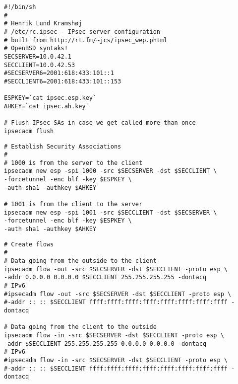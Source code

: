 \documentclass[Screen16to9,17pt,footrule]{foils}
\begin{document}
\begin{verbatim}
#!/bin/sh
#
# Henrik Lund Kramshøj
# /etc/rc.ipsec - IPsec server configuration
# built from http://rt.fm/~jcs/ipsec_wep.phtml
# OpenBSD syntaks!
SECSERVER=10.0.42.1
SECCLIENT=10.0.42.53
#SECSERVER6=2001:618:433:101::1
#SECCLIENT6=2001:618:433:101::153

ESPKEY=`cat ipsec.esp.key`
AHKEY=`cat ipsec.ah.key`

# Flush IPsec SAs in case we get called more than once
ipsecadm flush
\end{verbatim}



\begin{verbatim}
# Establish Security Associations
#
# 1000 is from the server to the client
ipsecadm new esp -spi 1000 -src $SECSERVER -dst $SECCLIENT \
-forcetunnel -enc blf -key $ESPKEY \
-auth sha1 -authkey $AHKEY

# 1001 is from the client to the server
ipsecadm new esp -spi 1001 -src $SECCLIENT -dst $SECSERVER \
-forcetunnel -enc blf -key $ESPKEY \
-auth sha1 -authkey $AHKEY
\end{verbatim}



\small
\begin{verbatim}
# Create flows
#
# Data going from the outside to the client
ipsecadm flow -out -src $SECSERVER -dst $SECCLIENT -proto esp \
-addr 0.0.0.0 0.0.0.0 $SECCLIENT 255.255.255.255 -dontacq
# IPv6
#ipsecadm flow -out -src $SECSERVER -dst $SECCLIENT -proto esp \
#-addr :: :: $SECCLIENT ffff:ffff:ffff:ffff:ffff:ffff:ffff:ffff -dontacq

# Data going from the client to the outside
ipsecadm flow -in -src $SECSERVER -dst $SECCLIENT -proto esp \
-addr $SECCLIENT 255.255.255.255 0.0.0.0 0.0.0.0 -dontacq
# IPv6
#ipsecadm flow -in -src $SECSERVER -dst $SECCLIENT -proto esp \
#-addr :: :: $SECCLIENT ffff:ffff:ffff:ffff:ffff:ffff:ffff:ffff -dontacq
\end{verbatim}



\end{document}
